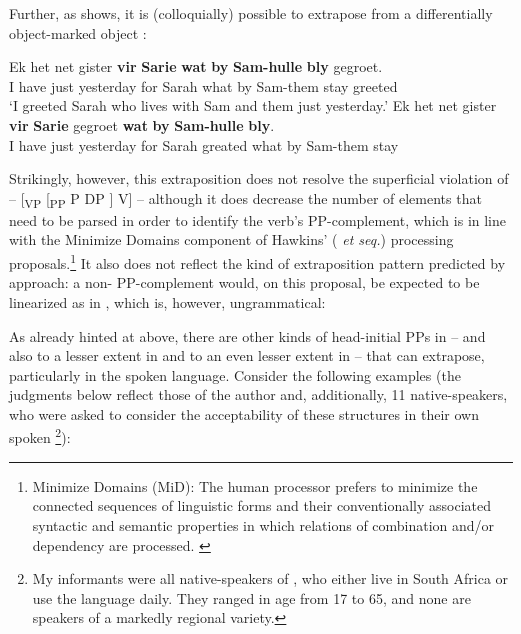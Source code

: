 \documentclass[output=paper]{LSP/langsci}
\begin{document}
Further, as  shows, it is (colloquially) possible to extrapose from a differentially object-marked object : 

\ea%
    \label{ex:biberauer:18}
    \ea\label{ex:biberauer:18a}
    \gll  Ek het  net gister  \textbf{vir} \textbf{Sarie} \textbf{wat} \textbf{by} \textbf{Sam-hulle} \textbf{bly}   gegroet.    \\
	 I    have just yesterday for Sarah what by Sam-them  stay greeted\\
    \glt  ‘I greeted Sarah who lives with Sam and them just yesterday.’
     \ex \label{ex:biberauer:18b}
\gll  Ek het   net  gister        \textbf{vir} \textbf{Sarie} gegroet \textbf{wat} \textbf{by} \textbf{Sam-hulle} \textbf{bly}. \\
  I    have just yesterday for Sarah greated what by Sam-them  stay \\
\z\z

Strikingly, however, this extraposition does not resolve the superficial violation of  – [\textsubscript{VP} [\textsubscript{PP} P DP ] V] – although it does decrease the number of elements that need to be parsed in order to identify the verb’s PP-complement, which is in line with the Minimize Domains component of Hawkins’ (\citeyear{Hawkins1994} \textit{et seq.}) processing proposals.\footnote{Minimize Domains (MiD): The human processor prefers to minimize the connected sequences of linguistic forms and their conventionally associated syntactic and semantic properties in which relations of combination and/or dependency are processed. \citep[32]{Hawkins2004}} It also does not reflect the kind of extraposition pattern predicted by  approach: a non- PP-complement would, on this proposal, be expected to be linearized as in , which is, however, ungrammatical:

\ea%
    \label{ex:biberauer:19}
\z
\z

As already hinted at above, there are other kinds of head-initial PPs in  – and also to a lesser extent in  and to an even lesser extent in  – that can extrapose, particularly in the spoken language. Consider the following examples (the judgments below reflect those of the author and, additionally, 11 native-speakers, who were asked to consider the acceptability of these structures in their own spoken \footnote{My informants were all native-speakers of , who either live in South Africa or use the language daily. They ranged in age from 17 to 65, and none are speakers of a markedly regional variety.}):
\end{document}
